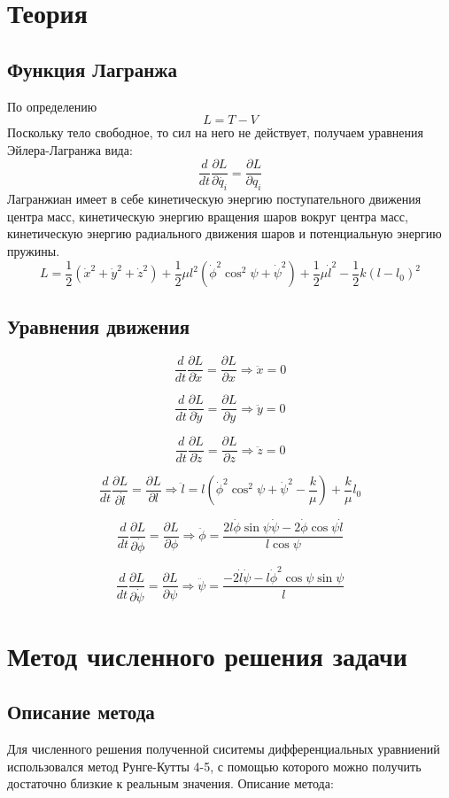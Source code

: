 \documentclass[a4paper, 12pt]{article}
\begin{document}
\section{Теория}
 \subsection{Функция Лагранжа}
    По определению
    \[L = T - V\]
    Поскольку тело свободное, то сил на него не действует, получаем уравнения Эйлера-Лагранжа вида:
    \[\frac{d}{dt}\frac{\partial L}{\partial \dot{q_i}} = \frac{\partial L}{\partial q_i}\]
 Лагранжиан имеет в себе кинетическую энергию поступательного движения центра масс, кинетическую энергию вращения шаров вокруг центра масс, кинетическую энергию радиального движения шаров и потенциальную энергию пружины.
    \[L = \frac{1}{2}(\dot{x}^2+\dot{y}^2+\dot{z}^2) + \frac{1}{2}\mu l^2(\dot{\phi}^2{\cos^2{\psi}} + \dot{\psi}^2) + \frac{1}{2}\mu \dot{l}^2 - \frac{1}{2}k(l-l_0)^2\]
    \subsection{Уравнения движения}
    \[\frac{d}{dt}\frac{\partial L}{\partial \dot{x}} = \frac{\partial L}{\partial x} \Longrightarrow \ddot{x} = 0\]
    
    \[\frac{d}{dt}\frac{\partial L}{\partial \dot{y}} = \frac{\partial L}{\partial y} \Longrightarrow \ddot{y} = 0\]
    
    \[\frac{d}{dt}\frac{\partial L}{\partial \dot{z}} = \frac{\partial L}{\partial z}
    \Longrightarrow \ddot{z} = 0\]
    
    \[\frac{d}{dt}\frac{\partial L}{\partial \dot{l}} = \frac{\partial L}{\partial l}
    \Longrightarrow \ddot{l} = l(\dot{\phi}^2{\cos^2{\psi}} + \dot{\psi}^2 - \frac{k}{\mu}) + \frac{k}{\mu}l_0\]
    
 \[\frac{d}{dt}\frac{\partial L}{\partial \dot{\phi}} = \frac{\partial L}{\partial \phi}
    \Longrightarrow \ddot{\phi} = \frac{2l\dot{\phi}\sin{\psi}\dot{\psi} - 2\dot{\phi}\cos{\psi}\dot{l}}{l\cos{\psi}}\]
    
    \[\frac{d}{dt}\frac{\partial L}{\partial \dot{\psi}} = \frac{\partial L}{\partial \psi}
    \Longrightarrow \ddot{\psi} = \frac{-2\dot{l}\dot{\psi} - l\dot{\phi}^2\cos{\psi}\sin{\psi}}{l}\]
 \newpage
\section{Метод численного решения задачи}
\subsection{Описание метода}
Для численного решения полученной сиситемы дифференциальных уравниений использовался метод Рунге-Кутты 4-5, с помощью которого можно получить достаточно близкие к реальным значения. Описание метода:
\end{document}
